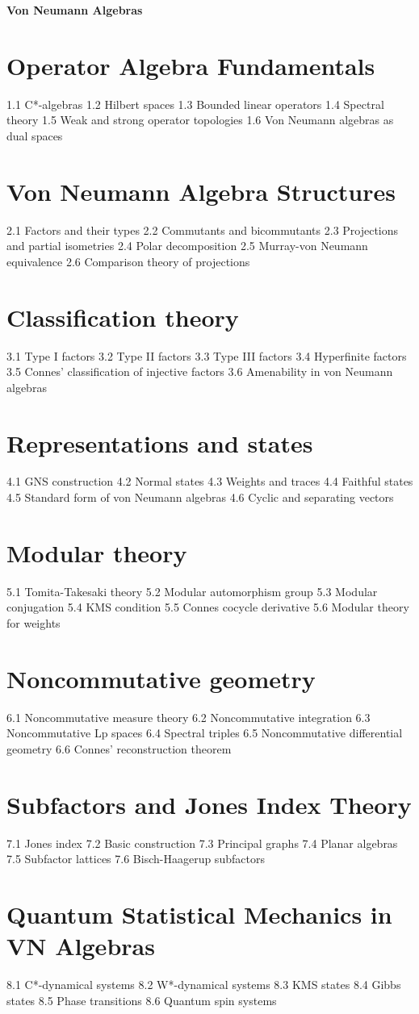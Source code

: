 {\LARGE \bf{Von Neumann Algebras}}
\section{Operator Algebra Fundamentals}
1.1 C*-algebras
1.2 Hilbert spaces
1.3 Bounded linear operators
1.4 Spectral theory
1.5 Weak and strong operator topologies
1.6 Von Neumann algebras as dual spaces
\section{Von Neumann Algebra Structures}
2.1 Factors and their types
2.2 Commutants and bicommutants
2.3 Projections and partial isometries
2.4 Polar decomposition
2.5 Murray-von Neumann equivalence
2.6 Comparison theory of projections
\section{Classification theory}
3.1 Type I factors
3.2 Type II factors
3.3 Type III factors
3.4 Hyperfinite factors
3.5 Connes' classification of injective factors
3.6 Amenability in von Neumann algebras
\section{Representations and states}
4.1 GNS construction
4.2 Normal states
4.3 Weights and traces
4.4 Faithful states
4.5 Standard form of von Neumann algebras
4.6 Cyclic and separating vectors
\section{Modular theory}
5.1 Tomita-Takesaki theory
5.2 Modular automorphism group
5.3 Modular conjugation
5.4 KMS condition
5.5 Connes cocycle derivative
5.6 Modular theory for weights
\section{Noncommutative geometry}
6.1 Noncommutative measure theory
6.2 Noncommutative integration
6.3 Noncommutative Lp spaces
6.4 Spectral triples
6.5 Noncommutative differential geometry
6.6 Connes' reconstruction theorem
\section{Subfactors and Jones Index Theory}
7.1 Jones index
7.2 Basic construction
7.3 Principal graphs
7.4 Planar algebras
7.5 Subfactor lattices
7.6 Bisch-Haagerup subfactors
\section{Quantum Statistical Mechanics in VN Algebras}
8.1 C*-dynamical systems
8.2 W*-dynamical systems
8.3 KMS states
8.4 Gibbs states
8.5 Phase transitions
8.6 Quantum spin systems
